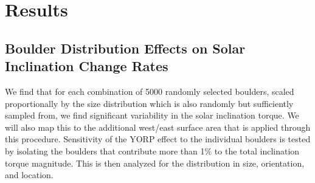       







\section{Results} \label{results}
\subsection{Boulder Distribution Effects on Solar Inclination Change Rates}
We find that for each combination of 5000 randomly selected boulders, scaled proportionally by the size distribution which is also randomly but sufficiently sampled from, we find significant variability in the solar inclination torque. We will also map this to the additional west/east surface area that is applied through this procedure. Sensitivity of the YORP effect to the individual boulders is tested by isolating the boulders that contribute more than 1\% to the total inclination torque magnitude. This is then analyzed for the distribution in size, orientation, and location.

